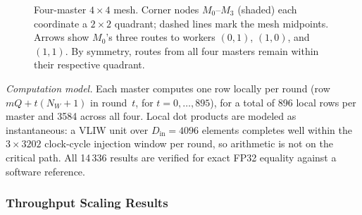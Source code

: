 \begin{figure}[t]
  \centering
  \caption{Four-master $4\times4$ mesh.  Corner nodes $M_0$--$M_3$ (shaded)
           each coordinate a $2\times2$ quadrant; dashed lines mark the mesh
           midpoints.  Arrows show $M_0$'s three routes to workers $(0,1)$,
           $(1,0)$, and $(1,1)$.  By symmetry, routes from all four masters
           remain within their respective quadrant.}
  \label{fig:mesh4x4-4m}
\end{figure}

\emph{Computation model.}  Each master computes one row locally per round
(row $mQ + t(N_W+1)$ in round~$t$, for $t = 0,\ldots,895$), for a total
of 896 local rows per master and 3584 across all four.  Local dot products
are modeled as instantaneous: a VLIW unit over $D_\text{in}=4096$ elements
completes well within the $3\times3202$ clock-cycle injection window per round,
so arithmetic is not on the critical path.  All 14\,336 results are verified
for exact FP32 equality against a software reference.

\subsubsection{Throughput Scaling Results}

